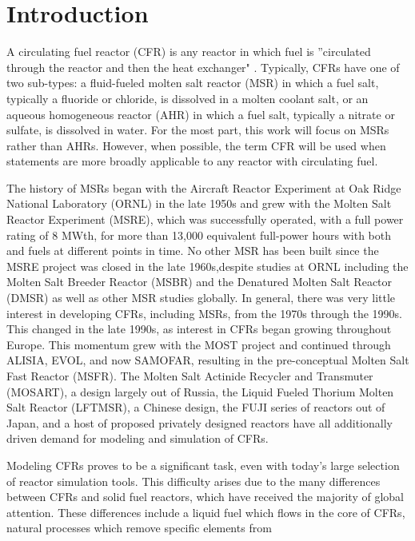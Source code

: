 \documentclass[review]{elsarticle}
\begin{document}
\linenumbers

\section{Introduction} \label{sec:intro}
A circulating fuel reactor (CFR) is any reactor in which fuel is ''circulated
 through the reactor and then the heat exchanger" \cite{ergen_1954}.
 Typically, CFRs have one of two sub-types: a fluid-fueled molten salt reactor
 (MSR) in which a fuel salt, typically a fluoride or chloride, is dissolved
 in a molten coolant salt, or an aqueous homogeneous reactor (AHR) in which
 a fuel salt, typically a nitrate or sulfate, is dissolved in water.
 For the most part, this work will focus on MSRs rather than AHRs. However,
 when possible, the term CFR will be used when statements are more broadly
 applicable to any reactor with circulating fuel.
\par The history of MSRs began with the Aircraft Reactor Experiment at Oak Ridge National
 Laboratory (ORNL) in the late 1950s and grew with the Molten Salt Reactor Experiment
 (MSRE), which was successfully operated, with a full power rating of 8 MWth, for more than 13,000
 equivalent full-power hours with both  and  fuels at different
points in time. No other MSR has been built since the MSRE project was closed
 in the late 1960s,despite studies at ORNL including the Molten Salt Breeder
 Reactor (MSBR) and the Denatured Molten Salt Reactor (DMSR) as well as other MSR studies
 globally. In general, there was very little interest in
 developing CFRs, including MSRs, from the 1970s through the 1990s.  This
 changed in the late 1990s, as interest in CFRs began growing throughout Europe. This momentum
grew with the MOST project and continued through ALISIA, EVOL, and now SAMOFAR, resulting in
the pre-conceptual Molten Salt Fast Reactor (MSFR). The Molten Salt Actinide
Recycler and Transmuter (MOSART), a design largely out of Russia, the
Liquid Fueled Thorium Molten Salt Reactor (LFTMSR), a Chinese design, the
FUJI series of reactors out of Japan, and a host of proposed privately designed
reactors have all additionally driven demand for
modeling and simulation of CFRs. 
\par Modeling CFRs proves to be a significant task, even with today's
large selection of reactor simulation tools. This difficulty arises due to
the many differences between CFRs and solid fuel reactors, which have received the
majority of global attention. These differences include a liquid fuel
 which flows in the core of CFRs, natural processes which remove specific elements from
\end{document}
